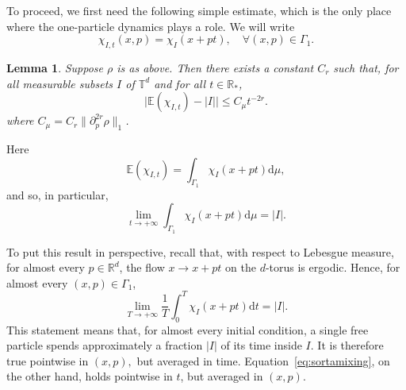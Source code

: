 \documentclass{article}
\newcommand {\E}{\mathbb{E}}
\newcommand {\R}{\mathbb{R}}
\newcommand {\rd}{\mathrm{d}}
\newcommand {\T}{\mathbb{T}}
\newtheorem{lemma}[theorem]{Lemma}
\numberwithin{equation}{section}
\begin{document}
To proceed, we first need the following simple estimate, which is the only place where the one-particle dynamics plays a role. We will write
\begin{equation}\label{eq:chiIt}
\chi_{I,t}(x,p)=\chi_I(x+pt),\quad \forall (x,p)\in \Gamma_1.
\end{equation}
\begin{lemma} \label{lem:oneparticle}
Suppose $\rho$ is as above. Then there exists a constant $C_r$ such that, for all measurable subsets $I$ of $\T^d$ and for all $t\in\R_*$,
\begin{equation}\label{eq:expestimate}
\mid \E(\chi_{I,t})-|I|\mid\leq C_\mu t^{-2r}.
\end{equation}
where $C_\mu=C_r\|\partial_p^{2r}\rho\|_1$.
\end{lemma}
\noindent Here
\begin{equation*}
\E (\chi_{I,t})=\int_{\Gamma_1} \chi_I(x+pt) \rd \mu,
\end{equation*}
and so, in particular,
\begin{equation}\label{eq:sortamixing}
\lim_{t\to+\infty} \int_{\Gamma_1} \chi_I(x+pt) \rd \mu = |I| .
\end{equation}

To put this result in perspective, recall that, with respect to Lebesgue measure, for almost every $p\in\R^d$, the flow $x\to x+pt$ on the $d$-torus is ergodic. Hence, for  almost every $(x,p)\in \Gamma_1$,
\begin{equation}\label{eq:ergodic1particle}
\lim_{T\to+\infty}\frac1T\int_0^T \chi_I(x+pt)\rd t=|I|.
\end{equation}
This statement means that, for almost every initial
condition, a single free particle  spends approximately a
fraction $|I|$ of its time inside $I.$ It is therefore true pointwise in $(x,p),$ but averaged
in time. Equation~\eqref{eq:sortamixing}, on the other hand, holds pointwise in $t$, but averaged in $(x,p)$.
\end{document}
